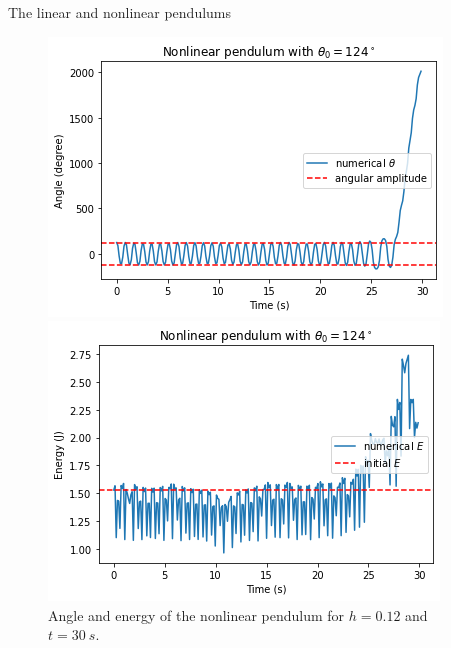 \documentclass{article}
\begin{document}
\begin{section}{The linear and nonlinear pendulums}
\begin{enumerate}[1.]
\begin{tcolorbox}[breakable]
		\begin{figure}[H]
			\centering
			\begin{minipage}{0.45\textwidth}
				\centering
				\includegraphics[width=\linewidth]{images/nonlinear_drift_theta2.png}
			\end{minipage}
			\begin{minipage}{0.45\textwidth}
				\centering
				\includegraphics[width=\linewidth]{images/nonlinear_drift_energy2.png}
			\end{minipage}
			\caption{Angle and energy of the nonlinear pendulum for $h = 0.12$ and $t = \SI{30}{s}$.}
			\label{fig:nonlinear_drift_theta_energy2}
		\end{figure}
	\end{tcolorbox}
\end{enumerate}
\end{section}
\end{document}
